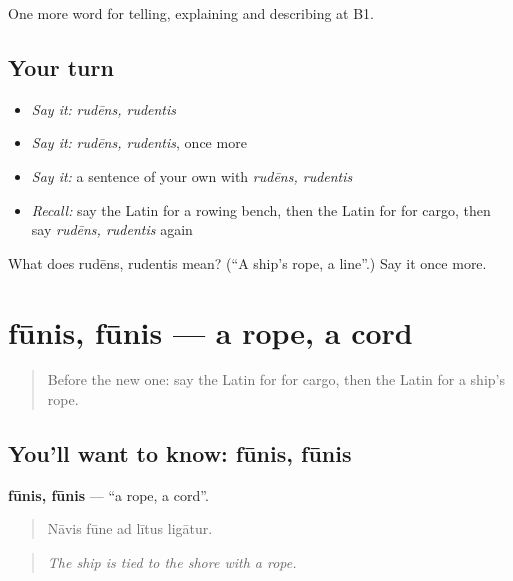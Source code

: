 \begin{grammarlens}[title={What you've built}]
One more word for telling, explaining and describing at B1.
\end{grammarlens}

\subsection*{Your turn}
\begin{itemize}
\raggedright
  \item \emph{Say it:} \emph{rudēns, rudentis}
  \item \emph{Say it:} \emph{rudēns, rudentis}, once more
  \item \emph{Say it:} a sentence of your own with \emph{rudēns, rudentis}
  \item \emph{Recall:} say the Latin for a rowing bench, then the Latin for for cargo, then say \emph{rudēns, rudentis} again
\end{itemize}

\begin{tcolorbox}[breakable,colback=teal!4,colframe=teal!35!black,title={Before you move on}]
What does rudēns, rudentis mean? (\textquotedblleft{}A ship's rope, a line\textquotedblright{}.) Say it once more.
\end{tcolorbox}
\section[fūnis, fūnis]{fūnis, fūnis — a rope, a cord}

\label{lesson:LA-C437-funis}



\begin{quote}
Before the new one: say the Latin for for cargo, then the Latin for a ship's rope.
\end{quote}

\subsection*{You'll want to know: fūnis, fūnis}
\textbf{fūnis, fūnis} — \textquotedblleft{}a rope, a cord\textquotedblright{}.

\begin{quote}
Nāvis fūne ad lītus ligātur.
\end{quote}

\begin{quote}
\emph{The ship is tied to the shore with a rope.}
\end{quote}

